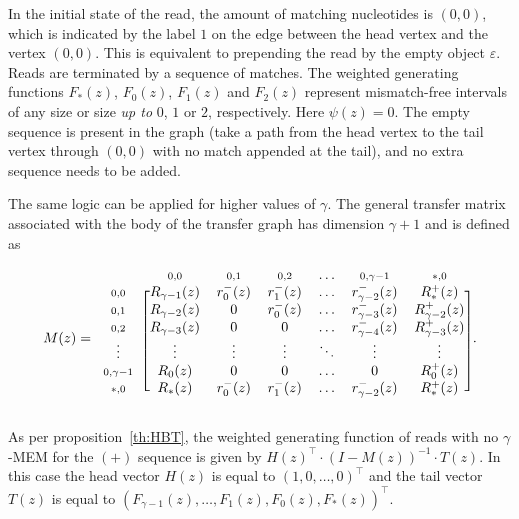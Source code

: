 \documentclass{article}
\begin{document}
In the initial state of the read, the amount of matching nucleotides is
$(0,0)$, which is indicated by the label $1$ on the edge between the head
vertex and the vertex $(0,0)$. This is equivalent to prepending the read
by the empty object $\varepsilon$. Reads are terminated by a sequence of
matches. The weighted generating functions $F_*(z)$, $F_0(z)$, $F_1(z)$
and $F_2(z)$ represent mismatch-free intervals of any size or size
\emph{up to} $0$, $1$ or $2$, respectively. Here $\psi(z) = 0$. The empty
sequence is present in the graph (take a path from the head vertex to the
tail vertex through $(0,0)$ with no match appended at the tail), and no
extra sequence needs to be added.

The same logic can be applied for higher values of $\gamma$. The general
transfer matrix associated with the body of the transfer graph has
dimension $\gamma+1$ and is defined as


\begin{equation*}
M(z) =
\begin{blockarray}{ccccccc}
   & \scriptstyle{0,0} & \scriptstyle{0,1} & \scriptstyle{0,2}
   & \ldots & \scriptstyle{0,\gamma-1} & \scriptstyle{*,0} \\
\begin{block}{c[cccccc]}
\scriptstyle{0,0} & R_{\gamma-1}(z) &
    r_0^-(z) & r_1^-(z) & \ldots & r_{\gamma-2}^-(z) & R_*^+(z) \\
\scriptstyle{0,1} & R_{\gamma-2}(z) & 0 & r_0^-(z) &
    \ldots & r_{\gamma-3}^-(z) & R_{\gamma-2}^+(z) \\
\scriptstyle{0,2} & R_{\gamma-3}(z) & 0 & 0 &
    \ldots & r_{\gamma-4}^-(z) & R_{\gamma-3}^+(z)  \\
\vdots & \vdots & \vdots & \vdots & \ddots & \vdots & \vdots \\
\scriptstyle{0,\gamma-1} & R_0(z) & 0 & 0 & \ldots & 0 & R_0^+(z) \\
\scriptstyle{*,0} & R_*(z) &
    r_0^-(z) & r_1^-(z) & \ldots & r_{\gamma-2}^-(z) & R_*^+(z) \\
\end{block}
\end{blockarray}.
\end{equation*}


As per proposition~\ref{th:HBT}, the weighted generating function of reads
with no $\gamma$-MEM for the $(+)$ sequence is given by $H(z)^\top \cdot
(I-M(z))^{-1} \cdot T(z)$. In this case the head vector $H(z)$ is equal to
$(1,0,\ldots,0)^\top$ and the tail vector $T(z)$ is equal to
$(F_{\gamma-1}(z), \ldots, F_1(z), F_0(z), F_*(z))^\top$.
\end{document}

